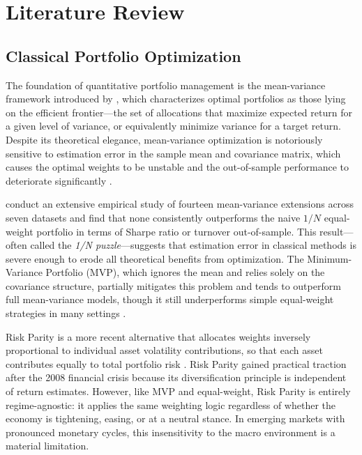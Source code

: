 \section{Literature Review}
\label{sec:litreview}

\subsection{Classical Portfolio Optimization}
\label{subsec:lit_classical}

The foundation of quantitative portfolio management is the mean-variance framework
introduced by \citet{Markowitz1952}, which characterizes optimal portfolios as those
lying on the efficient frontier---the set of allocations that maximize expected return
for a given level of variance, or equivalently minimize variance for a target return.
Despite its theoretical elegance, mean-variance optimization is notoriously sensitive
to estimation error in the sample mean and covariance matrix, which causes the optimal
weights to be unstable and the out-of-sample performance to deteriorate significantly
\citep{Merton1980}.

\citet{DeMiguel2007} conduct an extensive empirical study of fourteen mean-variance
extensions across seven datasets and find that none consistently outperforms the naive
$1/N$ equal-weight portfolio in terms of Sharpe ratio or turnover out-of-sample.
This result---often called the \emph{1/N puzzle}---suggests that estimation error in
classical methods is severe enough to erode all theoretical benefits from
optimization.
The Minimum-Variance Portfolio (MVP), which ignores the mean and relies solely on the
covariance structure, partially mitigates this problem and tends to outperform
full mean-variance models, though it still underperforms simple equal-weight strategies
in many settings \citep{Clarke2011}.

Risk Parity is a more recent alternative that allocates weights inversely proportional
to individual asset volatility contributions, so that each asset contributes equally to
total portfolio risk \citep{Qian2011, Maillard2010}.
Risk Parity gained practical traction after the 2008 financial crisis because its
diversification principle is independent of return estimates.
However, like MVP and equal-weight, Risk Parity is entirely regime-agnostic: it
applies the same weighting logic regardless of whether the economy is tightening,
easing, or at a neutral stance.
In emerging markets with pronounced monetary cycles, this insensitivity to the
macro environment is a material limitation.


